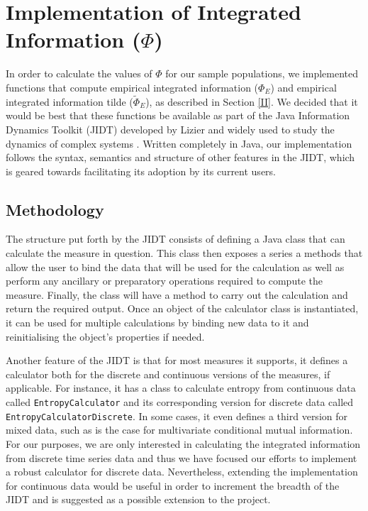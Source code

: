 \documentclass[a4paper,11pt]{article}
\begin{document}
\clearpage
\section{Implementation of Integrated Information ($\Phi$)}
\label{sec:impl}

In order to calculate the values of $\Phi$ for our sample populations, we implemented functions that compute empirical integrated information ($\Phi_{E}$) and empirical integrated information tilde ($\widetilde{\Phi}_{E}$), as described in Section \ref{II}. We decided that it would be best that these functions be available as part of the Java Information Dynamics Toolkit (JIDT) developed by Lizier and widely used to study the dynamics of complex systems \cite{Lizier2014}. Written completely in Java, our implementation follows the syntax, semantics and structure of other features in the JIDT, which is geared towards facilitating its adoption by its current users.

\subsection{Methodology}
\label{sec:impl:methods}

The structure put forth by the JIDT consists of defining a Java class that can calculate the measure in question. This class then exposes a series a methods that allow the user to bind the data that will be used for the calculation as well as perform any ancillary or preparatory operations required to compute the measure. Finally, the class will have a method to carry out the calculation and return the required output. Once an object of the calculator class is instantiated, it can be used for multiple calculations by binding new data to it and reinitialising the object's properties if needed. 

Another feature of the JIDT is that for most measures it supports, it defines a calculator both for the discrete and continuous versions of the measures, if applicable. For instance, it has a class to calculate entropy from continuous data called \texttt{EntropyCalculator} and its corresponding version for discrete data called \texttt{EntropyCalculatorDiscrete}. In some cases, it even defines a third version for mixed data, such as is the case for multivariate conditional mutual information. For our purposes, we are only interested in calculating the integrated information from discrete time series data and thus we have focused our efforts to implement a robust calculator for discrete data. Nevertheless, extending the implementation for continuous data would be useful in order to increment the breadth of the JIDT and is suggested as a possible extension to the project.
\end{document}
